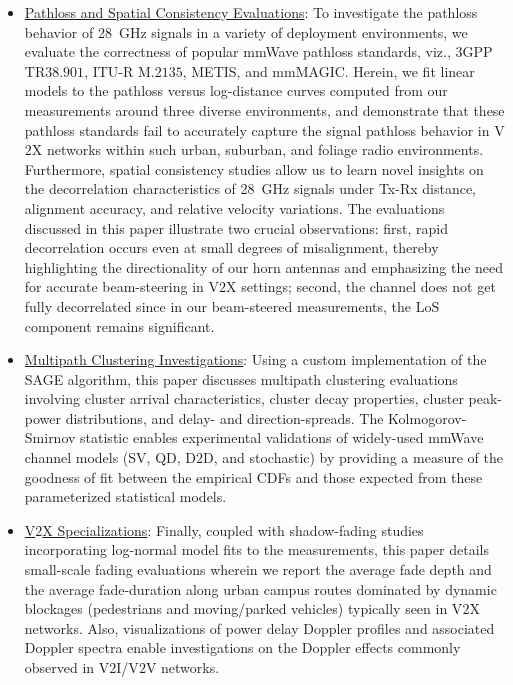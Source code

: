 \documentclass[12pt, draftcls, onecolumn]{IEEEtran}
\begin{document}
\begin{itemize}[leftmargin=*]
    \item \underline{Pathloss and Spatial Consistency Evaluations}: To investigate the pathloss behavior of \SI{28}{\giga\hertz} signals in a variety of deployment environments, we evaluate the correctness of popular mmWave pathloss standards, viz., $3$GPP TR$38.901$, ITU-R M$.2135$, METIS, and mmMAGIC. Herein, we fit linear models to the pathloss versus log-distance curves computed from our measurements around three diverse environments, and demonstrate that these pathloss standards fail to accurately capture the signal pathloss behavior in V$2$X networks within such urban, suburban, and foliage radio environments. Furthermore, spatial consistency studies allow us to learn novel insights on the decorrelation characteristics of \SI{28}{\giga\hertz} signals under Tx-Rx distance, alignment accuracy, and relative velocity variations. The evaluations discussed in this paper illustrate two crucial observations: first, rapid decorrelation occurs even at small degrees of misalignment, thereby highlighting the directionality of our horn antennas and emphasizing the need for accurate beam-steering in V$2$X settings; second, the channel does not get fully decorrelated since in our beam-steered measurements, the LoS component remains significant.
    \item \underline{Multipath Clustering Investigations}: Using a custom implementation of the SAGE algorithm, this paper discusses multipath clustering evaluations involving cluster arrival characteristics, cluster decay properties, cluster peak-power distributions, and delay- and direction-spreads. The Kolmogorov-Smirnov statistic enables experimental validations of widely-used mmWave channel models (SV, QD, D$2$D, and stochastic) by providing a measure of the goodness of fit between the empirical CDFs and those expected from these parameterized statistical models.
    \item \underline{V$2$X Specializations}: Finally, coupled with shadow-fading studies incorporating log-normal model fits to the measurements, this paper details small-scale fading evaluations wherein we report the average fade depth and the average fade-duration along urban campus routes dominated by dynamic blockages (pedestrians and moving/parked vehicles) typically seen in V$2$X networks. Also, visualizations of power delay Doppler profiles and associated Doppler spectra enable investigations on the Doppler effects commonly observed in V$2$I/V$2$V networks.
\end{itemize}
\end{document}
